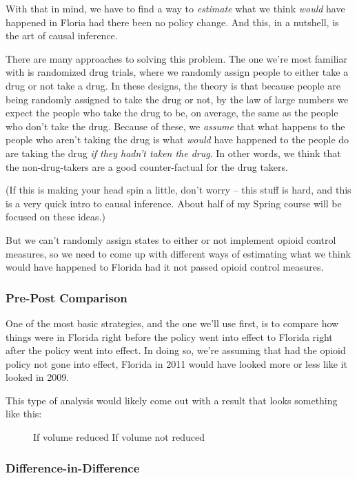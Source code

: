 \documentclass[12pt]{article}
\begin{document}
With that in mind, we have to find a way to \emph{estimate} what we think \emph{would} have happened in Floria had there been no policy change. And this, in a nutshell, is the art of causal inference.

There are many approaches to solving this problem. The one we're most familiar with is randomized drug trials, where we randomly assign people to either take a drug or not take a drug. In these designs, the theory is that because people are being randomly assigned to take the drug or not, by the law of large numbers we expect the people who take the drug to be, on average, the same as the people who don't take the drug. Because of these, we \emph{assume} that what happens to the people who aren't taking the drug is what \emph{would} have happened to the people do are taking the drug \emph{if they hadn't taken the drug}. In other words, we think that the non-drug-takers are a good counter-factual for the drug takers.

(If this is making your head spin a little, don't worry -- this stuff is hard, and this is a very quick intro to causal inference. About half of my Spring course will be focused on these ideas.)

But we can't randomly assign states to either or not implement opioid control measures, so we need to come up with different ways of estimating what we think would have happened to Florida had it not passed opioid control measures.

\subsubsection*{Pre-Post Comparison}

One of the most basic strategies, and the one we'll use first, is to compare how things were in Florida right before the policy went into effect to Florida right after the policy went into effect. In doing so, we're assuming that had the opioid policy not gone into effect, Florida in 2011 would have looked more or less like it looked in 2009.

This type of analysis would likely come out with a result that looks something like this:

\begin{figure}
  \centering
  \caption{}\label{}
  If volume reduced  \hspace{1cm} If volume not reduced
\end{figure}

\subsubsection*{Difference-in-Difference}
\end{document}
